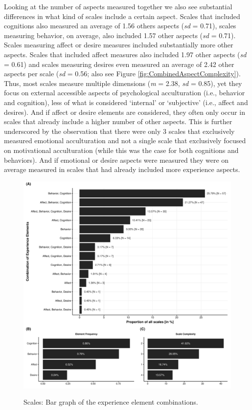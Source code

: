 Looking at the number of aspects measured together we also see
substantial differences in what kind of scales include a certain aspect.
Scales that included cognitions also measured an average of 1.56 others
aspects (\textit{sd} = 0.71), scales measuring behavior, on average,
also included 1.57 other aspects (\textit{sd} = 0.71). Scales measuring
affect or desire measures included substantially more other aspects.
Scales that included affect measures also included 1.97 other aspects
(\textit{sd} = 0.61) and scales measuring desires even measured an
average of 2.42 other aspects per scale (\textit{sd} = 0.56; also see
Figure \ref{fig:CombinedAspectComplexity}). Thus, most scales measure
multiple dimensions (\textit{m} = 2.38, \textit{sd} = 0.85), yet they
focus on external accessible aspects of psychological acculturation
(i.e., behavior and cognition), less of what is considered `internal' or
`subjective' (i.e., affect and desires). And if affect or desire
elements are considered, they often only occur in scales that already
include a higher number of other aspects. This is further underscored by
the observation that there were only 3 scales that exclusively measured
emotional acculturation and not a single scale that exclusively focused
on motivational acculturation (while this was the case for both
cognitions and behaviors). And if emotional or desire aspects were
measured they were on average measured in scales that had already
included more experience aspects.

\begin{figure}[h]
\centering
\caption{Scales: Bar graph of the experience element combinations.}
\includegraphics[width=\textwidth]{Figures/ABCDFreq-1}
\label{fig:ElementsScales}
\end{figure}


